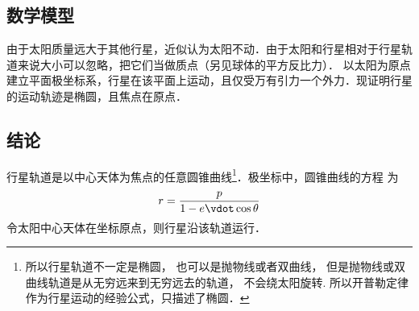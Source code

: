 

\subsection{数学模型}
由于太阳质量远大于其他行星，近似认为太阳不动．由于太阳和行星相对于行星轨道来说大小可以忽略，把它们当做质点（另见球体的平方反比力）．%
以太阳为原点建立平面极坐标系，行星在该平面上运动，且仅受万有引力一个外力．现证明行星的运动轨迹是椭圆，且焦点在原点．

\subsection{结论}
行星轨道是以中心天体为焦点的任意圆锥曲线\footnote{所以行星轨道不一定是椭圆， 也可以是抛物线或者双曲线， 但是抛物线或双曲线轨道是从无穷远来到无穷远去的轨道， 不会绕太阳旋转. 所以开普勒定律作为行星运动的经验公式，只描述了椭圆．}．极坐标中，圆锥曲线的方程
为
\begin{equation}\label{Keple1_eq1}
r = \frac{p}{{1 - e \vdot \cos \theta }}
\end{equation}
令太阳中心天体在坐标原点，则行星沿该轨道运行．


